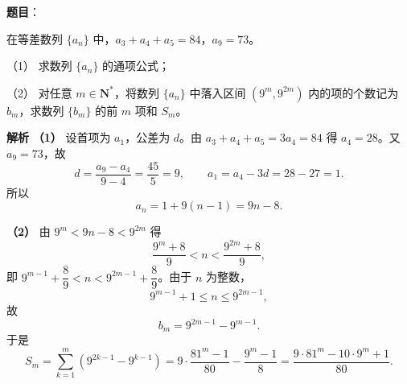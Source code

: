 \begin{answer}

\textbf{题目}：

在等差数列 $\{a_n\}$ 中，$a_3+a_4+a_5=84$，$a_9=73$。

（1） 求数列 $\{a_n\}$ 的通项公式；

（2） 对任意 $m\in\mathbf N^*$，将数列 $\{a_n\}$ 中落入区间 $(9^m,9^{2m})$ 内的项的个数记为 $b_m$，求数列 $\{b_m\}$ 的前 $m$ 项和 $S_m$。

\textbf{解析}
\textbf{（1）} 设首项为 $a_1$，公差为 $d$。由 $a_3+a_4+a_5=3a_4=84$ 得 $a_4=28$。又 $a_9=73$，故
\nopagebreak[4]
\[d=\frac{a_9-a_4}{9-4}=\frac{45}5=9,\qquad a_1=a_4-3d=28-27=1.\]
所以
\nopagebreak[4]
\[a_n=1+9(n-1)=9n-8.\]

\textbf{（2）} 由 $9^m<9n-8<9^{2m}$ 得
\nopagebreak[4]
\[\frac{9^m+8}9<n<\frac{9^{2m}+8}9,\]
即 $9^{m-1}+\dfrac89<n<9^{2m-1}+\dfrac89$。由于 $n$ 为整数，
\nopagebreak[4]
\[9^{m-1}+1\leqslant n\leqslant9^{2m-1},\]
故
\nopagebreak[4]
\[b_m=9^{2m-1}-9^{m-1}.\]
于是
\nopagebreak[4]
\[S_m=\sum_{k=1}^m\left(9^{2k-1}-9^{k-1}\right)=9\cdot\frac{81^m-1}{80}-\frac{9^m-1}8=\frac{9\cdot81^m-10\cdot9^m+1}{80}.\]



\end{answer}
